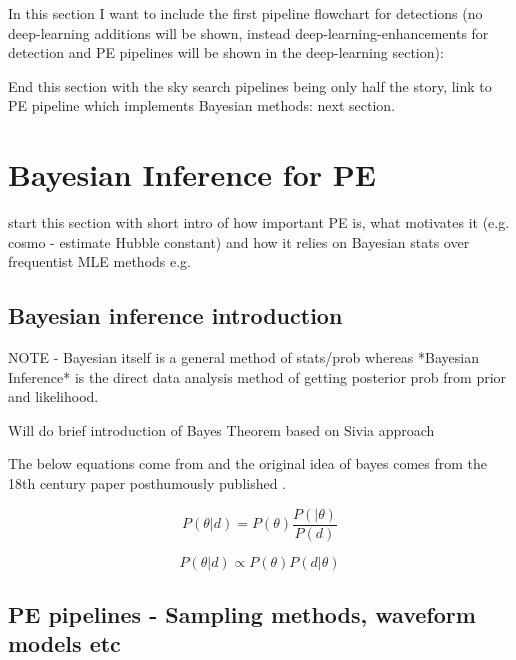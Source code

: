 \documentclass[11pt]{article}
\begin{document}
In this section I want to include the first pipeline flowchart for detections (no deep-learning additions will be shown, instead deep-learning-enhancements for detection and PE pipelines will be shown in the  deep-learning section):


End this section with the sky search pipelines being only half the story, link to PE pipeline which implements Bayesian methods: next section.

\section{Bayesian Inference for PE}

start this section with short intro of how important PE is, what motivates it (e.g. cosmo \-- estimate Hubble constant) 
and how it relies on Bayesian stats over frequentist MLE methods e.g. 

\subsection{Bayesian inference introduction}

NOTE - Bayesian itself is a general method of stats/prob whereas *Bayesian Inference* is the direct data analysis method of getting posterior prob from prior and likelihood.

Will do brief introduction of Bayes Theorem based on Sivia approach \cite{sivia2006textbook}


The below equations come from \cite{sivia2006textbook} and the original idea of bayes comes from the 18th century paper posthumously published \cite{bayesog}.

\begin{equation}
\label{eq:bayes_equal}
P(\theta|d) = P(\theta ) \frac{P( |\theta)}{P(d)}
\end{equation}

\begin{equation}
\label{eq:bayes_propto}
P(\theta|d) \propto P(\theta ){P(d |\theta)}
\end{equation}

\subsection{PE pipelines - Sampling methods, waveform models etc}
\end{document}
